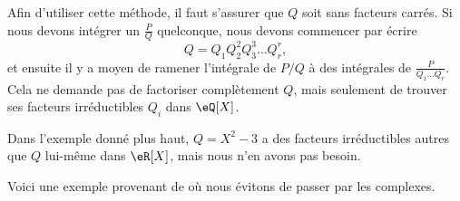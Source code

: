 \begin{remark}
    Afin d'utiliser cette méthode, il faut s'assurer que \( Q\) soit sans facteurs carrés. Si nous devons intégrer un \( \frac{ P }{ Q }\) quelconque, nous devons commencer par écrire
    \begin{equation}
        Q=Q_1Q_2^2Q_3^3\ldots Q_r^r,
    \end{equation}
    et ensuite il y a moyen de ramener l'intégrale de \( P/Q\) à des intégrales de \( \frac{ P }{ Q_1\ldots Q_r }\). Cela ne demande pas de factoriser complètement \( Q\), mais seulement de trouver ses facteurs irréductibles \( Q_i\) dans \( \eQ[X]\).

    Dans l'exemple donné plus haut, \( Q=X^2-3\) a des facteurs irréductibles autres que \( Q\) lui-même dans \( \eR[X]\), mais nous n'en avons pas besoin.
\end{remark}

Voici une exemple provenant de \cite{LTjwacY} où nous évitons de passer par les complexes.

